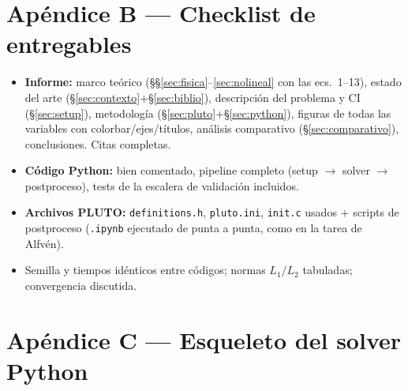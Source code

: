 \documentclass[11pt,a4paper]{article}
\newcommand{\code}[1]{\texttt{#1}}
\begin{document}
\section{Apéndice B — Checklist de entregables}
\label{app:checklist}

\begin{itemize}[nosep]
\item[$\square$] \textbf{Informe:} marco teórico (§§\ref{sec:fisica}--\ref{sec:nolineal} con
las ecs.\ 1--13), estado del arte (\S\ref{sec:contexto}+\S\ref{sec:biblio}), descripción del
problema y CI (\S\ref{sec:setup}), metodología (\S\ref{sec:pluto}+\S\ref{sec:python}),
figuras de todas las variables con colorbar/ejes/títulos, análisis comparativo
(\S\ref{sec:comparativo}), conclusiones. Citas completas.
\item[$\square$] \textbf{Código Python:} bien comentado, pipeline completo
(setup $\to$ solver $\to$ postproceso), tests de la escalera de validación incluidos.
\item[$\square$] \textbf{Archivos PLUTO:} \code{definitions.h}, \code{pluto.ini},
\code{init.c} usados + scripts de postproceso (\code{.ipynb} ejecutado de punta a punta,
como en la tarea de Alfvén).
\item[$\square$] Semilla y tiempos idénticos entre códigos; normas $L_1/L_2$ tabuladas;
convergencia discutida.
\end{itemize}

\section{Apéndice C — Esqueleto del solver Python}
\label{app:esqueleto}
\end{document}
